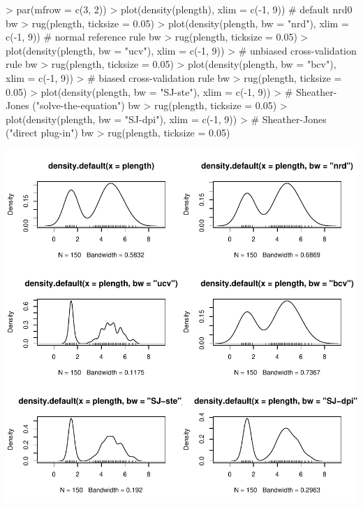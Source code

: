 \documentclass[12pt,letterpaper,final]{article}
\begin{document}
\begin{Schunk}
\begin{Sinput}
> par(mfrow = c(3, 2))
> plot(density(plength), xlim = c(-1, 9))                # default nrd0 bw
> rug(plength, ticksize = 0.05)
> plot(density(plength, bw = "nrd"), xlim = c(-1, 9))    # normal reference rule bw
> rug(plength, ticksize = 0.05)
> plot(density(plength, bw = "ucv"), xlim = c(-1, 9))    
>                                    # unbiased cross-validation rule bw
> rug(plength, ticksize = 0.05)
> plot(density(plength, bw = "bcv"), xlim = c(-1, 9))    
>                                    # biased cross-validation rule bw
> rug(plength, ticksize = 0.05)
> plot(density(plength, bw = "SJ-ste"), xlim = c(-1, 9)) 
>                                    # Sheather-Jones ("solve-the-equation") bw
> rug(plength, ticksize = 0.05)
> plot(density(plength, bw = "SJ-dpi"), xlim = c(-1, 9)) 
>                                    # Sheather-Jones ("direct plug-in") bw
> rug(plength, ticksize = 0.05)
\end{Sinput}
\end{Schunk}
\includegraphics{lect_main-027}
\end{document}
